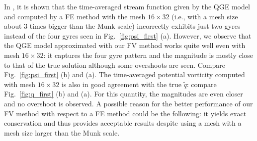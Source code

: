 \documentclass[11pt,a4paper]{article}
\begin{document}
In \cite{San2011}, it is shown that the time-averaged stream function given by the QGE model
and computed by a FE method with the mesh $16 \times 32$ (i.e., with a mesh size about 3 times bigger than the Munk scale) 
incorrectly exhibits just two gyres instead of the four gyres seen in Fig.~\ref{fig:psi_first} (a). 
However, we observe that the QGE model approximated with our 
FV method works quite well even with mesh $16 \times 32$: it captures the four gyre pattern and the magnitude is mostly close to 
that of the true solution although some overshoots are seen. Compare Fig.~\ref{fig:psi_first} (b) and (a). 
The time-averaged potential vorticity computed with mesh $16 \times 32$ is also in good agreement
with the true $\widetilde{q}$: compare Fig.~\ref{fig:q_first} (b) and (a). For this quantity, the magnitudes
are even closer and no overshoot is observed. 
A possible reason for the better performance of our FV method with respect to a FE method could be the following:
it yields exact conservation and thus provides acceptable results despite using a
mesh with a mesh size larger than the Munk scale.
\end{document}

